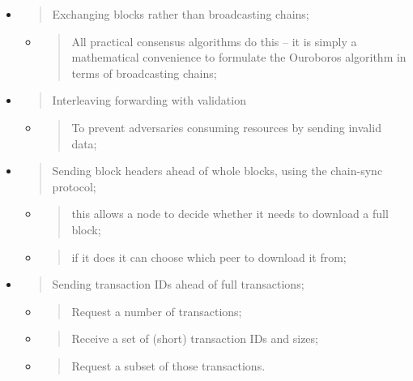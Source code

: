 \documentclass[]{article}
\begin{document}
\begin{itemize}
\item
  \begin{quote}
  Exchanging blocks rather than broadcasting chains;
  \end{quote}

  \begin{itemize}
  \item
    \begin{quote}
    All practical consensus algorithms do this -- it is simply a
    mathematical convenience to formulate the Ouroboros algorithm in
    terms of broadcasting chains;
    \end{quote}
  \end{itemize}
\item
  \begin{quote}
  Interleaving forwarding with validation
  \end{quote}

  \begin{itemize}
  \item
    \begin{quote}
    To prevent adversaries consuming resources by sending invalid data;
    \end{quote}
  \end{itemize}
\item
  \begin{quote}
  Sending block headers ahead of whole blocks, using the chain-sync
  protocol;
  \end{quote}

  \begin{itemize}
  \item
    \begin{quote}
    this allows a node to decide whether it needs to download a full
    block;
    \end{quote}
  \item
    \begin{quote}
    if it does it can choose which peer to download it from;
    \end{quote}
  \end{itemize}
\item
  \begin{quote}
  Sending transaction IDs ahead of full transactions;
  \end{quote}

  \begin{itemize}
  \item
    \begin{quote}
    Request a number of transactions;
    \end{quote}
  \item
    \begin{quote}
    Receive a set of (short) transaction IDs and sizes;
    \end{quote}
  \item
    \begin{quote}
    Request a subset of those transactions.
    \end{quote}
  \end{itemize}
\end{itemize}
\end{document}
